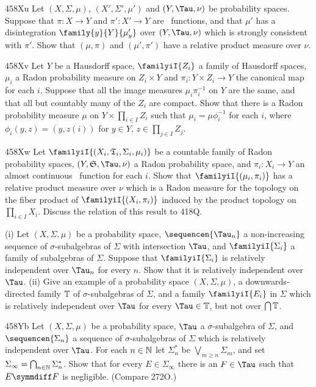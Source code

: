 {\spheader 458Xu Let $(X,\Sigma,\mu)$, $(X',\Sigma',\mu')$ and
$(Y,\Tau,\nu)$ be probability spaces.   Suppose that $\pi:X\to Y$
and $\pi':X'\to Y$ are \imp\ functions, and that $\mu'$ has a
disintegration $\family{y}{Y}{\mu'_y}$ over $(Y,\Tau,\nu)$ which is
strongly consistent with $\pi'$.   Show that $(\mu,\pi)$ and
$(\mu',\pi')$
have a relative product measure over $\nu$.   

\sqheader 458Xv Let $Y$ be a Hausdorff space, $\familyiI{Z_i}$ a family
of Hausdorff spaces, $\mu_i$ a Radon probability measure on
$Z_i\times Y$ and $\pi_i:Y\times Z_i\to Y$ the canonical map for each
$i$.   Suppose that all the image measures $\mu_i\pi_i^{-1}$ on $Y$ are
the same, and that all but countably many of the $Z_i$ are compact.
Show that there is a Radon probability measure $\mu$ on
$Y\times\prod_{i\in I}Z_i$ such that $\mu_i=\mu\phi_i^{-1}$ for each
$i$, where $\phi_i(y,z)=(y,z(i))$ for $y\in Y$, $z\in\prod_{j\in I}Z_j$.

\spheader 458Xw Let $\familyiI{(X_i,\frak T_i,\Sigma_i,\mu_i)}$ be a
countable family of Radon
probability spaces, $(Y,\frak S,\Tau,\nu)$ a Radon probability space,
and $\pi_i:X_i\to Y$ an almost continuous \imp\ function for each $i$.
Show
that $\familyiI{(\mu_i,\pi_i)}$ has a relative product measure
over $\nu$ which is a Radon measure for the topology on the fiber
product of $\familyiI{(X_i,\pi_i)}$ induced by the product topology on
$\prod_{i\in I}X_i$.   Discuss the relation of this result to 418Q.

%
(i) Let $(X,\Sigma,\mu)$ be a probability space,
$\sequencen{\Tau_n}$ a non-increasing sequence of $\sigma$-subalgebras of
$\Sigma$ with intersection $\Tau$, and $\familyiI{\Sigma_i}$ a family of
subalgebras of $\Sigma$.   Suppose that $\familyiI{\Sigma_i}$ is relatively
independent over $\Tau_n$ for every $n$.   Show that it is relatively
independent over $\Tau$.   
(ii) Give an example of a probability space
$(X,\Sigma,\mu)$, a downwards-directed
family $\Bbb T$ of $\sigma$-subalgebras of $\Sigma$,
and a family $\familyiI{E_i}$ in $\Sigma$ which is
relatively independent over $\Tau$ for every $\Tau\in\Bbb T$, but not over
$\bigcap\Bbb T$.

\spheader 458Yb Let $(X,\Sigma,\mu)$ be a probability space, $\Tau$ a
$\sigma$-subalgebra of $\Sigma$, and $\sequencen{\Sigma_n}$ a sequence
of $\sigma$-subalgebras of $\Sigma$ which is relatively independent over
$\Tau$.   For each $n\in\Bbb N$ let $\Sigma^*_n$ be
$\bigvee_{m\ge n}\Sigma_m$, and set
$\Sigma_{\infty}=\bigcap_{n\in\Bbb N}\Sigma^*_n$.   Show that for every
$E\in\Sigma_{\infty}$ there is an $F\in\Tau$ such that $E\symmdiff F$ is
negligible.   (Compare 272O.)

}
